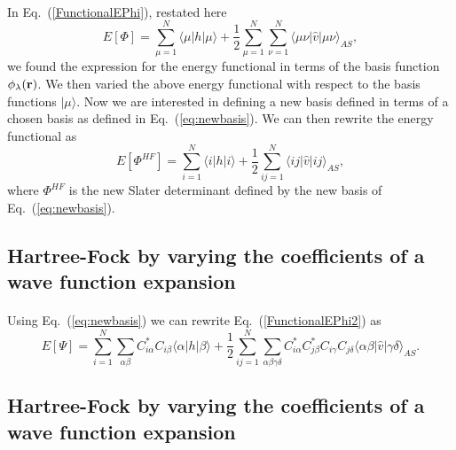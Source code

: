 \documentclass[%
twoside,                 %
final,                   %
10pt]{article}
\begin{document}
\paragraph{}
In Eq.~(\ref{FunctionalEPhi}), restated here
\[
  E[\Phi] 
  = \sum_{\mu=1}^N \langle \mu | h | \mu \rangle +
  \frac{1}{2}\sum_{{\mu}=1}^N\sum_{{\nu}=1}^N \langle \mu\nu|\hat{v}|\mu\nu\rangle_{AS},
\]
we found the expression for the energy functional in terms of the basis function $\phi_{\lambda}({\bf r})$. We then  varied the above energy functional with respect to the basis functions $|\mu \rangle$. 
Now we are interested in defining a new basis defined in terms of
a chosen basis as defined in Eq.~(\ref{eq:newbasis}). We can then rewrite the energy functional as
\begin{equation}
  E[\Phi^{HF}] 
  = \sum_{i=1}^N \langle i | h | i \rangle +
  \frac{1}{2}\sum_{ij=1}^N\langle ij|\hat{v}|ij\rangle_{AS}, \label{FunctionalEPhi2}
\end{equation}
where $\Phi^{HF}$ is the new Slater determinant defined by the new basis of Eq.~(\ref{eq:newbasis}).



\subsection{Hartree-Fock by varying the coefficients of a wave function expansion}

\paragraph{}
Using Eq.~(\ref{eq:newbasis}) we can rewrite Eq.~(\ref{FunctionalEPhi2}) as 
\begin{equation}
  E[\Psi] 
  = \sum_{i=1}^N \sum_{\alpha\beta} C^*_{i\alpha}C_{i\beta}\langle \alpha | h | \beta \rangle +
  \frac{1}{2}\sum_{ij=1}^N\sum_{{\alpha\beta\gamma\delta}} C^*_{i\alpha}C^*_{j\beta}C_{i\gamma}C_{j\delta}\langle \alpha\beta|\hat{v}|\gamma\delta\rangle_{AS}. \label{FunctionalEPhi3}
\end{equation}



\subsection{Hartree-Fock by varying the coefficients of a wave function expansion}
\end{document}
